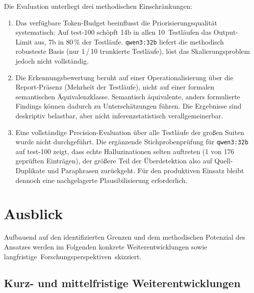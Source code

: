 Die Evaluation unterliegt drei methodischen Einschränkungen:
\begin{enumerate}
    \item Das verfügbare Token-Budget beeinflusst die Priorisierungsqualität systematisch: Auf test-100 schöpft 14b in allen 10~Testläufen das Output-Limit aus, 7b in 80\,\% der Testläufe. \texttt{qwen3:32b} liefert die methodisch robusteste Basis (nur 1\,/\,10 trunkierte Testläufe), löst das Skalierungsproblem jedoch nicht vollständig.
    \item Die Erkennungsbewertung beruht auf einer Operationalisierung über die Report-Präsenz (Mehrheit der Testläufe), nicht auf einer formalen semantischen Äquivalenzklasse. Semantisch äquivalente, anders formulierte Findings können dadurch zu Unterschätzungen führen. Die Ergebnisse sind deskriptiv belastbar, aber nicht inferenzstatistisch verallgemeinerbar.
    \item Eine vollständige Precision-Evaluation über alle Testläufe der großen Suiten wurde nicht durchgeführt. Die ergänzende Stichprobenprüfung für \texttt{qwen3:32b} auf test-100 zeigt, dass echte Halluzinationen selten auftreten (1 von 176 geprüften Einträgen), der größere Teil der Überdetektion also auf Quell-Duplikate und Paraphrasen zurückgeht. Für den produktiven Einsatz bleibt dennoch eine nachgelagerte Plausibilisierung erforderlich.
\end{enumerate}

\section{Ausblick}
\label{sec:fazit_ausblick}

Aufbauend auf den identifizierten Grenzen und dem methodischen Potenzial des Ansatzes werden im Folgenden konkrete Weiterentwicklungen sowie \mbox{langfristige Forschungsperspektiven skizziert.}

\subsection{Kurz- und mittelfristige Weiterentwicklungen}
\label{sec:ausblick_kurz_mittel}

